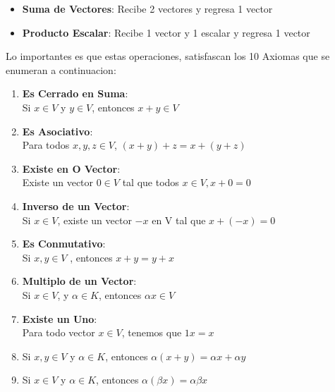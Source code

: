 \documentclass[12pt]{report}                                %
\begin{document}
        \begin{itemize}
            \item \textbf{Suma de Vectores}: Recibe 2 vectores y regresa 1 vector
            \item \textbf{Producto Escalar}: Recibe 1 vector y 1 escalar y regresa 1 vector
        \end{itemize}

        Lo importantes es que estas operaciones, satisfascan los 10 Axiomas
        que se enumeran a continuacion:

        \begin{enumerate}
            \item \textbf{Es Cerrado en Suma}:\\
            Si $x \in V$ y $y \in V$, entonces $x+y \in V$

            \item \textbf{Es Asociativo}:\\
            Para todos $x,y,z \in V$, $(x+y) + z = x + (y+z)$

            \item \textbf{Existe en O Vector}:\\
            Existe un vector $0 \in V$ tal que todos $x \in V, x + 0 = 0 $

            \item \textbf{Inverso de un Vector}:\\
            Si $x \in V$, existe un vector $-x$ en V tal que $x+(-x) = 0$

            \item \textbf{Es Conmutativo}:\\
            Si $x,y \in V$ , entonces $x + y = y + x$

            \item \textbf{Multiplo de un Vector}:\\
            Si $x \in V$, y $\alpha \in K$, entonces $\alpha x \in V$

            \item \textbf{Existe un Uno}:\\
            Para todo vector $x \in V$, tenemos que $1x = x$  

            \item Si $x,y \in V$ y $\alpha \in K$, entonces $\alpha(x+y) = \alpha x + \alpha y$

            \item Si $x \in V$ y $\alpha \in K$, entonces $\alpha(\beta x) = \alpha \beta x$          

        \end{enumerate}
\end{document}
